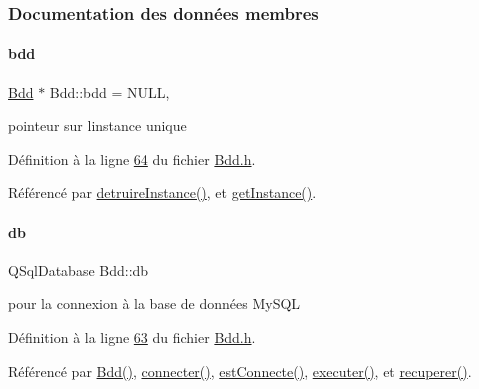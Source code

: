 \subsubsection{Documentation des données membres}
\mbox{\label{class_bdd_a09bd3b3a31feedf3dd42a507e0249213}} 
\paragraph{\texorpdfstring{bdd}{bdd}}
{\footnotesize\ttfamily \hyperlink{class_bdd}{Bdd} $\ast$ Bdd\+::bdd = N\+U\+LL\hspace{0.3cm}{\ttfamily [static]}, {\ttfamily [private]}}



pointeur sur l\textquotesingle{}instance unique 



Définition à la ligne \hyperlink{_bdd_8h_source_l00064}{64} du fichier \hyperlink{_bdd_8h_source}{Bdd.\+h}.



Référencé par \hyperlink{_bdd_8cpp_source_l00073}{detruire\+Instance()}, et \hyperlink{_bdd_8cpp_source_l00053}{get\+Instance()}.

\mbox{\label{class_bdd_a8628c1686deda86999f86689c3e7268e}} 
\paragraph{\texorpdfstring{db}{db}}
{\footnotesize\ttfamily Q\+Sql\+Database Bdd\+::db\hspace{0.3cm}{\ttfamily [private]}}



pour la connexion à la base de données My\+S\+QL 



Définition à la ligne \hyperlink{_bdd_8h_source_l00063}{63} du fichier \hyperlink{_bdd_8h_source}{Bdd.\+h}.



Référencé par \hyperlink{_bdd_8cpp_source_l00027}{Bdd()}, \hyperlink{_bdd_8cpp_source_l00093}{connecter()}, \hyperlink{_bdd_8cpp_source_l00134}{est\+Connecte()}, \hyperlink{_bdd_8cpp_source_l00146}{executer()}, et \hyperlink{_bdd_8cpp_source_l00187}{recuperer()}.

\mbox{\label{class_bdd_a9fb6aa118a28c27307f27fd7662e462d}} 
